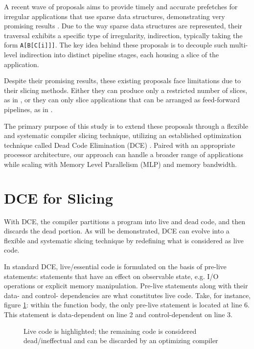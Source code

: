 \documentclass{acaces}
\begin{document}
A recent wave of proposals aims to provide timely and accurate prefetches for irregular applications that use sparse data structures,
demonstrating very promising results \cite{Manocha2021, Nguyen2023}.
Due to the way sparse data structures are represented,
their traversal exhibits a specific type of irregularity, indirection, typically taking the form \texttt{A[B[C[i]]]}.
The key idea behind these proposals is to decouple such multi-level indirection into distinct pipeline stages, each housing a slice of the application.

Despite their promising results, these existing proposals face limitations due to their slicing methods.
Either they can produce only a restricted number of slices, as in \cite{Manocha2021},
or they can only slice applications that can be arranged as feed-forward pipelines, as in \cite{Nguyen2023}.

The primary purpose of this study is to extend these proposals through a flexible and systematic compiler slicing technique,
utilizing an established optimization technique called Dead Code Elimination (DCE) \cite{cytron_efficiently_1991}.
Paired with an appropriate processor architecture, our approach can handle a broader range of applications while scaling
with Memory Level Parallelism (MLP) and memory bandwidth.

\section{DCE for Slicing}

With DCE, the compiler partitions a program into live and dead code, and then discards the dead portion.
As will be demonstrated, DCE can evolve into a flexible and systematic slicing technique by redefining what is considered as live code.

In standard DCE, live/essential code is formulated on the basis of pre-live statements:
statements that have an effect on observable state, e.g. I/O operations or explicit memory manipulation.
Pre-live statements along with their data- and control- dependencies are what constitutes live code.
Take, for instance, figure \ref{fig:dce}: within the function body, the only pre-live statement is located at line 6.
This statement is data-dependent on line 2 and control-dependent on line 3.

\begin{figure}[ht]
  \centering
  
  \caption{Live code is highlighted; the remaining code is considered dead/ineffectual and can be discarded by an optimizing compiler}
  \label{fig:dce}
\end{figure}
\end{document}
